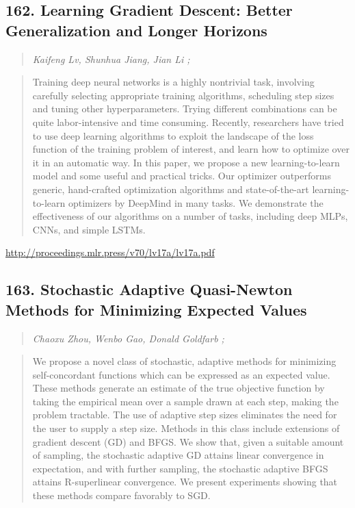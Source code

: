 \documentclass{article}
\begin{document}
\subsection{162. Learning Gradient Descent: Better Generalization and Longer Horizons}

\begin{quote}
\footnotesize{\textit{Kaifeng Lv, Shunhua Jiang, Jian Li ;}}

\end{quote}

\begin{quote}
    Training deep neural networks is a highly nontrivial task, involving carefully selecting appropriate training algorithms, scheduling step sizes and tuning other hyperparameters. Trying different combinations can be quite labor-intensive and time consuming. Recently, researchers have tried to use deep learning algorithms to exploit the landscape of the loss function of the training problem of interest, and learn how to optimize over it in an automatic way. In this paper, we propose a new learning-to-learn model and some useful and practical tricks. Our optimizer outperforms generic, hand-crafted optimization algorithms and state-of-the-art learning-to-learn optimizers by DeepMind in many tasks. We demonstrate the effectiveness of our algorithms on a number of tasks, including deep MLPs, CNNs, and simple LSTMs.  
\end{quote}

\href{http://proceedings.mlr.press/v70/lv17a/lv17a.pdf}{http://proceedings.mlr.press/v70/lv17a/lv17a.pdf}

\subsection{163. Stochastic Adaptive Quasi-Newton Methods for Minimizing Expected Values}

\begin{quote}
\footnotesize{\textit{Chaoxu Zhou, Wenbo Gao, Donald Goldfarb ;}}

\end{quote}

\begin{quote}
    We propose a novel class of stochastic, adaptive methods for minimizing self-concordant functions which can be expressed as an expected value. These methods generate an estimate of the true objective function by taking the empirical mean over a sample drawn at each step, making the problem tractable. The use of adaptive step sizes eliminates the need for the user to supply a step size. Methods in this class include extensions of gradient descent (GD) and BFGS. We show that, given a suitable amount of sampling, the stochastic adaptive GD attains linear convergence in expectation, and with further sampling, the stochastic adaptive BFGS attains R-superlinear convergence. We present experiments showing that these methods compare favorably to SGD.  
\end{quote}
\end{document}
